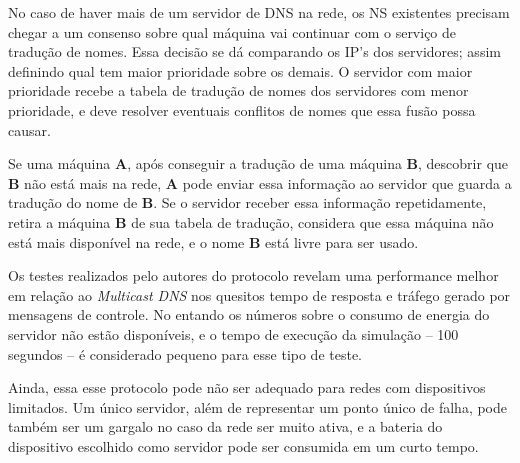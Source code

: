     No caso de haver mais de um servidor de DNS na rede, os NS existentes precisam
    chegar a um consenso sobre qual máquina vai continuar com o serviço de tradução
    de nomes. Essa decisão se dá comparando os IP's dos servidores; assim definindo
    qual tem maior prioridade sobre os demais. O servidor com maior prioridade recebe
    a tabela de tradução de nomes dos servidores com menor prioridade, e deve resolver
    eventuais conflitos de nomes que essa fusão possa causar.
  
    Se uma máquina \textbf{A}, após conseguir a tradução de uma máquina \textbf{B},
    descobrir que \textbf{B} não está mais na rede, \textbf{A} pode enviar essa 
    informação ao servidor que guarda a tradução do nome de \textbf{B}. Se o servidor
    receber essa informação repetidamente, retira a máquina \textbf{B} de sua 
    tabela de tradução, considera que essa máquina não está mais disponível na 
    rede, e o nome \textbf{B} está livre para ser usado.
  
    Os testes realizados pelo autores do protocolo revelam uma performance melhor
    em relação ao \textit{Multicast DNS} nos quesitos tempo de resposta e tráfego
    gerado por mensagens de controle. No entando os números sobre o consumo de 
    energia do servidor não estão disponíveis, e o tempo de execução da simulação
    -- 100 segundos -- é considerado pequeno para esse tipo de teste.
    
    Ainda, essa esse protocolo pode não ser adequado para redes com dispositivos
    limitados. Um único servidor, além de representar um ponto único de falha,
    pode também ser um gargalo no caso da rede ser muito ativa, e a bateria do
    dispositivo escolhido como servidor pode ser consumida em um curto tempo.
